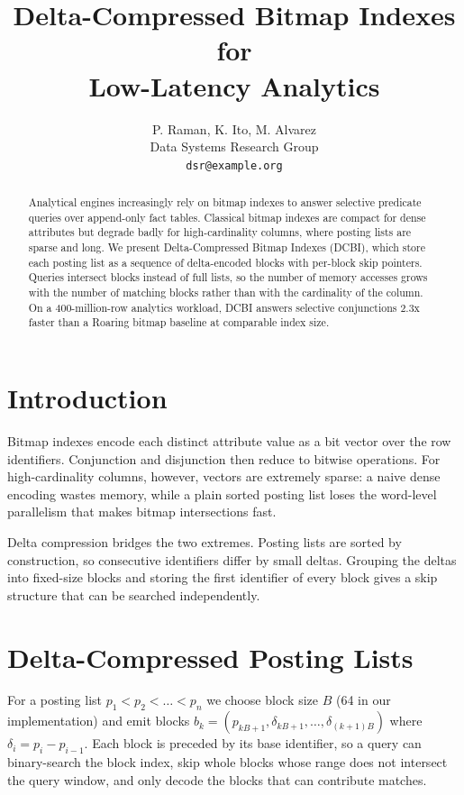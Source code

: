 \documentclass[11pt]{article}
\title{Delta-Compressed Bitmap Indexes for\\Low-Latency Analytics}
\author{P. Raman, K. Ito, M. Alvarez\\
Data Systems Research Group\\
\texttt{dsr@example.org}}
\begin{document}
\maketitle

\begin{abstract}
Analytical engines increasingly rely on bitmap indexes to answer selective
predicate queries over append-only fact tables. Classical bitmap indexes are
compact for dense attributes but degrade badly for high-cardinality columns,
where posting lists are sparse and long. We present Delta-Compressed Bitmap
Indexes (DCBI), which store each posting list as a sequence of delta-encoded
blocks with per-block skip pointers. Queries intersect blocks instead of full
lists, so the number of memory accesses grows with the number of matching
blocks rather than with the cardinality of the column. On a 400-million-row
analytics workload, DCBI answers selective conjunctions 2.3x faster than a
Roaring bitmap baseline at comparable index size.
\end{abstract}

\section{Introduction}
Bitmap indexes encode each distinct attribute value as a bit vector over the
row identifiers. Conjunction and disjunction then reduce to bitwise operations.
For high-cardinality columns, however, vectors are extremely sparse: a naive
dense encoding wastes memory, while a plain sorted posting list loses the
word-level parallelism that makes bitmap intersections fast.

Delta compression bridges the two extremes. Posting lists are sorted by
construction, so consecutive identifiers differ by small deltas. Grouping the
deltas into fixed-size blocks and storing the first identifier of every block
gives a skip structure that can be searched independently.

\section{Delta-Compressed Posting Lists}
For a posting list $p_1 < p_2 < \dots < p_n$ we choose block size $B$ (64 in
our implementation) and emit blocks $b_k = (p_{kB+1}, \delta_{kB+1}, \dots,
\delta_{(k+1)B})$ where $\delta_i = p_i - p_{i-1}$. Each block is preceded by
its base identifier, so a query can binary-search the block index, skip whole
blocks whose range does not intersect the query window, and only decode the
blocks that can contribute matches.
\end{document}
